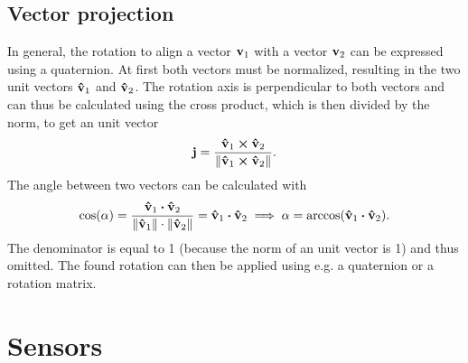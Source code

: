 \subsection{Vector projection}
\label{subsec:vector_projection}
In general, the rotation to align a vector $\vb{v}_1$ with a vector $\vb{v}_2$ can be expressed using a quaternion.
At first both vectors must be normalized, resulting in the two unit vectors $\vu{v}_1$ and $\vu{v}_2$.
The rotation axis is perpendicular to both vectors and can thus be calculated using the cross product, which is then divided by the norm, to get an unit vector
\begin{equation}
	\vb{j} = \frac{\vu{v}_1 \cp \vu{v}_2}{\norm{\vu{v}_1 \cp \vu{v}_2}}.
\end{equation}
The angle between two vectors can be calculated with
\begin{equation}
	\cos(\alpha) = \frac{\vu{v}_1 \vdot \vu{v}_2}{\norm{\vu{v}_1} \cdot \norm{\vu{v}_2}}
	= \vu{v}_1 \vdot \vu{v}_2 \implies
	\alpha = \arccos(\vu{v}_1 \vdot \vu{v}_2).
\end{equation}
The denominator is equal to 1 (because the norm of an unit vector is 1) and thus omitted.
The found rotation can then be applied using e.g. a quaternion or a rotation matrix.



\section{Sensors}
